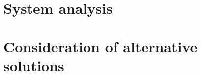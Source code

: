 \documentclass[a4paper, 11pt, titlepage]{report}
\begin{document}
\chapter{System analysis}

\chapter{Consideration of alternative solutions}

\renewcommand{\bibname}{References}

  
\end{document}
